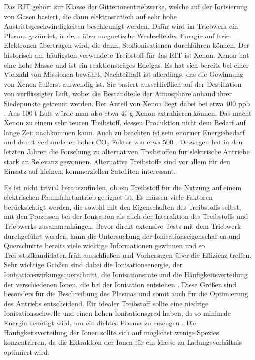 Das RIT gehört zur Klasse der Gitterionentriebwerke, welche auf der Ionisierung von Gasen basiert, die dann elektrostatisch auf sehr hohe Austrittsgeschwindigkeiten beschleunigt werden. Dafür wird im Triebwerk ein Plasma gezündet, in dem über magnetische Wechselfelder Energie auf freie Elektronen übertragen wird, die dann, Stoßionisationen durchführen können. Der historisch am häufigsten verwendete Treibstoff für das RIT ist Xenon. Xenon hat eine hohe Masse und ist ein reaktionsträges Edelgas. Es hat sich bereits bei einer Vielzahl von Missionen bewährt. Nachteilhaft ist allerdings, das die Gewinnung von Xenon äußerst aufwendig ist. Sie basiert ausschließlich auf der Destillation von verflüssigter Luft, wobei die Bestandteile der Atmosphäre anhand ihrer Siedepunkte getrennt werden. Der Anteil von Xenon liegt dabei bei etwa 400 ppb \cite{Xenon}. Aus 100 t Luft würde man also etwa 40 g Xenon extrahieren können. Das macht Xenon zu einem sehr teuren Treibstoff, dessen Produktion nicht dem Bedarf auf lange Zeit nachkommen kann. Auch zu beachten ist sein enormer Energiebedarf und damit verbundener hoher CO$_2$-Faktor von etwa 500 \cite{CO2}. Deswegen hat in den letzten Jahren die Forschung zu alternativen Treibstoffen für elektrische Antriebe stark an Relevanz gewonnen. Alternative Treibstoffe sind vor allem für den Einsatz auf kleinen, kommerziellen Satelliten interessant. 

Es ist nicht trivial herauszufinden, ob ein Treibstoff für die Nutzung auf einem elektrischen Raumfahrtantrieb geeignet ist. Es müssen viele Faktoren berücksichtigt werden, die sowohl mit den Eigenschaften des Treibstoffs selbst, mit den Prozessen bei der Ionisation als auch der Interaktion des Treibstoffs und Triebwerks zusammenhängen. Bevor direkt extensive Tests mit dem Triebwerk durchgeführt werden, kann die Untersuchung der Ionisationseigenschaften und Querschnitte bereits viele wichtige Informationen gewinnen und so Treibstoffkandidaten früh ausschließen und Vorhersagen über die Effizienz treffen. Sehr wichtige Größen sind dabei die Ionisationsenergie, der Ionisationswirkungsquerschnitt, die Ionisationsrate und die Häufigkeitsverteilung der verschiedenen Ionen, die bei der Ionisation entstehen \cite{ion}. Diese Größen sind besonders für die Beschreibung des Plasmas und somit auch für die Optimierung des Antriebs entscheidend. Ein idealer Treibstoff sollte eine niedrige Ionisationsschwelle und einen hohen Ionisationsgrad haben, da so minimale Energie benötigt wird, um ein dichtes Plasma zu erzeugen \cite{Prop}. Die Häufigkeitsverteilung der Ionen sollte sich auf möglichst wenige Spezies konzentrieren, da die Extraktion der Ionen für ein Masse-zu-Ladungsverhältnis optimiert wird.

